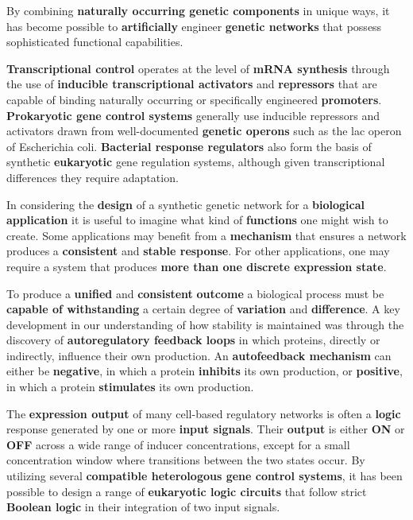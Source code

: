 \documentclass[10pt,a4paper,notitlepage]{article}
\begin{document}
By combining \textbf{naturally occurring genetic components} in unique ways, it has become possible to \textbf{artificially} engineer \textbf{genetic networks} that possess sophisticated functional capabilities.

\textbf{Transcriptional control} operates at the level of \textbf{mRNA synthesis} through the use of \textbf{inducible transcriptional activators} and \textbf{repressors} that are capable of binding naturally occurring or specifically engineered \textbf{promoters}.
\textbf{Prokaryotic gene control systems} generally use inducible repressors and activators drawn from well-documented \textbf{genetic operons} such as the lac operon of Escherichia coli.
\textbf{Bacterial response regulators} also form the basis of synthetic \textbf{eukaryotic} gene regulation systems, although given transcriptional differences they require adaptation.

In considering the \textbf{design} of a synthetic genetic network for a \textbf{biological application} it is useful to imagine what kind of \textbf{functions} one might wish to create. 
Some applications may benefit from a \textbf{mechanism} that ensures a network produces a \textbf{consistent} and \textbf{stable response}.
For other applications, one may require a system that produces \textbf{more than one discrete expression state}.

To produce a \textbf{unified} and \textbf{consistent} \textbf{outcome} a biological process must be \textbf{capable of withstanding} a certain degree of \textbf{variation} and \textbf{difference}.
A key development in our understanding of how stability is maintained was through the discovery of \textbf{autoregulatory feedback loops} in which proteins, directly or indirectly, influence their own production.
An \textbf{autofeedback mechanism} can either be \textbf{negative}, in which a protein \textbf{inhibits} its own production, or \textbf{positive}, in which a protein \textbf{stimulates} its own production.

The \textbf{expression output} of many cell-based regulatory networks is often a \textbf{logic} response generated by one or more \textbf{input signals}.
Their \textbf{output} is either \textbf{ON} or \textbf{OFF} across a wide range of inducer concentrations, except for a small concentration window where transitions between the two states occur.
By utilizing several \textbf{compatible heterologous gene control systems}, it has been possible to design a range of \textbf{eukaryotic logic circuits} that follow strict \textbf{Boolean logic} in their integration of two input signals.
\end{document}
